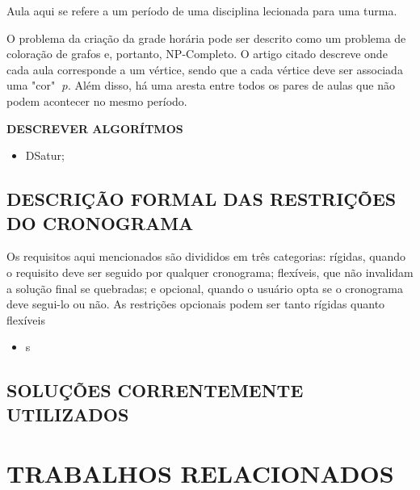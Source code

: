 \documentclass[12pt,a4paper]{article}
\begin{document}
		\par Aula aqui se refere a um período de uma disciplina lecionada para uma turma.

		\par O problema da criação da grade horária pode ser descrito como um problema de coloração de grafos \cite{complexity} e, portanto, NP-Completo. O artigo citado descreve onde cada aula corresponde a um vértice, sendo que a cada vértice deve ser associada uma "cor" $\;p$. Além disso, há uma aresta entre todos os pares de aulas que não podem acontecer no mesmo período.


		\par \textbf{DESCREVER ALGORÍTMOS}

		\begin{itemize}
			\item DSatur;
		\end{itemize}

		\subsection{DESCRIÇÃO FORMAL DAS RESTRIÇÕES DO CRONOGRAMA}

			Os requisitos aqui mencionados são divididos em três categorias: rígidas, quando o requisito deve ser seguido por qualquer cronograma; flexíveis, que não invalidam a solução final se quebradas; e opcional, quando o usuário opta se o cronograma deve segui-lo ou não. As restrições opcionais podem ser tanto rígidas quanto flexíveis

			\begin{itemize}
				\item s
			\end{itemize}
			\lipsum[1]

		\subsection{SOLUÇÕES CORRENTEMENTE UTILIZADOS}

			\lipsum[1]



			\lipsum[1]
	\newpage

	\section{TRABALHOS RELACIONADOS}
\end{document}
